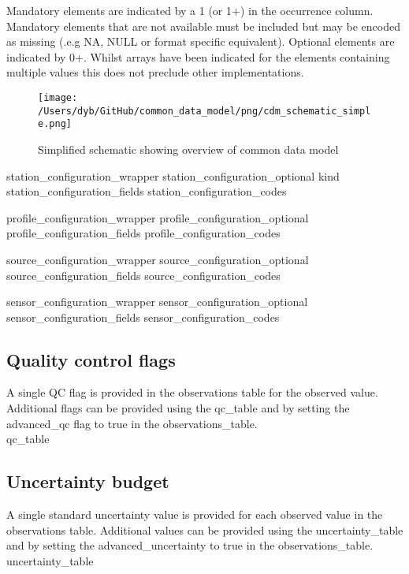 \documentclass[a4paper,11pt]{article}
\begin{document}
Mandatory elements are indicated by a 1 (or 1+) in the occurrence column. Mandatory elements that are not available must be included but may be encoded as missing (.e.g NA, NULL or format specific equivalent). Optional elements are indicated by 0+. Whilst arrays have been indicated for the elements containing multiple values this does not preclude other implementations. 

\begin{landscape}
\begin{figure}
\centering
\texttt{[image: /Users/dyb/GitHub/common\_data\_model/png/cdm\_schematic\_simple.png]}
\caption {Simplified schematic showing overview of common data model}
\end{figure}
\end{landscape}





 {station_configuration_wrapper}
 {station_configuration_optional}
 {kind}
 {station_configuration_fields}
 {station_configuration_codes}

 {profile_configuration_wrapper}
 {profile_configuration_optional}
 {profile_configuration_fields}
 {profile_configuration_codes}

 {source_configuration_wrapper}
 {source_configuration_optional}
 {source_configuration_fields}
 {source_configuration_codes}

 {sensor_configuration_wrapper}
 {sensor_configuration_optional}
 {sensor_configuration_fields}
 {sensor_configuration_codes}

\subsection {Quality control flags}
A single QC flag is provided in the observations table for the observed value. Additional flags can be provided using the qc\_table and by setting the advanced\_qc flag to true in the observations\_table.\\
 {qc_table}

\subsection {Uncertainty budget}
A single standard uncertainty value is provided for each observed value in the observations table. Additional values can be provided using the uncertainty\_table and by setting the advanced\_uncertainty to true in the observations\_table.\\
 {uncertainty_table}
\end{document}
